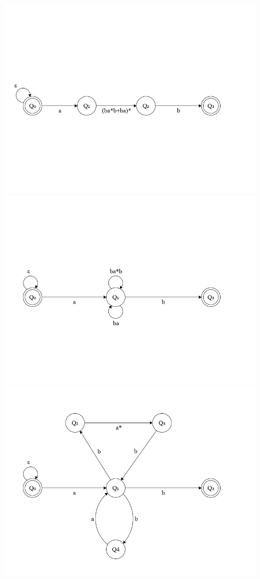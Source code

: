 \documentclass{article}
\begin{document}
\begin{enumerate}
			\includegraphics[width=\textwidth]{p2_3.png}\\
			\includegraphics[width=\textwidth]{p2_4.png}\\
			\includegraphics[width=\textwidth]{p2_5.png}\\

\end{enumerate}
\end{document}
